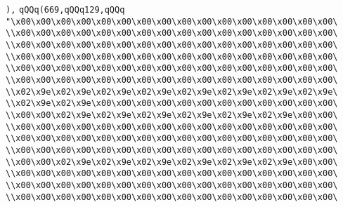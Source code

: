 \verb|),|\newline
\verb|qQQq(669,qQQq129,qQQq|\newline
\verb|"\x00\x00\x00\x00\x00\x00\x00\x00\x00\x00\x00\x00\x00\x00\x00\x00\|\newline
\verb|\\x00\x00\x00\x00\x00\x00\x00\x00\x00\x00\x00\x00\x00\x00\x00\x00\|\newline
\verb|\\x00\x00\x00\x00\x00\x00\x00\x00\x00\x00\x00\x00\x00\x00\x00\x00\|\newline
\verb|\\x00\x00\x00\x00\x00\x00\x00\x00\x00\x00\x00\x00\x00\x00\x00\x00\|\newline
\verb|\\x00\x00\x00\x00\x00\x00\x00\x00\x00\x00\x00\x00\x00\x00\x00\x00\|\newline
\verb|\\x00\x00\x00\x00\x00\x00\x00\x00\x00\x00\x00\x00\x00\x00\x00\x00\|\newline
\verb|\\x02\x9e\x02\x9e\x02\x9e\x02\x9e\x02\x9e\x02\x9e\x02\x9e\x02\x9e\|\newline
\verb|\\x02\x9e\x02\x9e\x00\x00\x00\x00\x00\x00\x00\x00\x00\x00\x00\x00\|\newline
\verb|\\x00\x00\x02\x9e\x02\x9e\x02\x9e\x02\x9e\x02\x9e\x02\x9e\x00\x00\|\newline
\verb|\\x00\x00\x00\x00\x00\x00\x00\x00\x00\x00\x00\x00\x00\x00\x00\x00\|\newline
\verb|\\x00\x00\x00\x00\x00\x00\x00\x00\x00\x00\x00\x00\x00\x00\x00\x00\|\newline
\verb|\\x00\x00\x00\x00\x00\x00\x00\x00\x00\x00\x00\x00\x00\x00\x00\x00\|\newline
\verb|\\x00\x00\x02\x9e\x02\x9e\x02\x9e\x02\x9e\x02\x9e\x02\x9e\x00\x00\|\newline
\verb|\\x00\x00\x00\x00\x00\x00\x00\x00\x00\x00\x00\x00\x00\x00\x00\x00\|\newline
\verb|\\x00\x00\x00\x00\x00\x00\x00\x00\x00\x00\x00\x00\x00\x00\x00\x00\|\newline
\verb|\\x00\x00\x00\x00\x00\x00\x00\x00\x00\x00\x00\x00\x00\x00\x00\x00\|\newline
